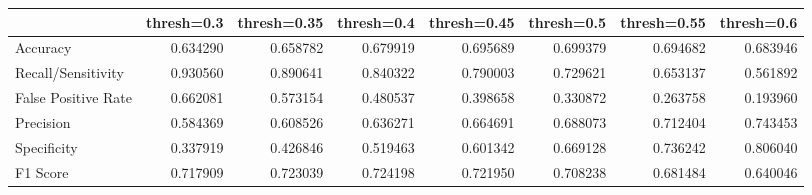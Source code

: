 \begin{tabu}{lrrrrrrr}
\toprule
 & thresh=0.3 & thresh=0.35 & thresh=0.4 & thresh=0.45 & thresh=0.5 & thresh=0.55 & thresh=0.6 \\
\midrule
Accuracy & 0.634290 & 0.658782 & 0.679919 & 0.695689 & 0.699379 & 0.694682 & 0.683946 \\
Recall/Sensitivity & 0.930560 & 0.890641 & 0.840322 & 0.790003 & 0.729621 & 0.653137 & 0.561892 \\
False Positive Rate & 0.662081 & 0.573154 & 0.480537 & 0.398658 & 0.330872 & 0.263758 & 0.193960 \\
Precision & 0.584369 & 0.608526 & 0.636271 & 0.664691 & 0.688073 & 0.712404 & 0.743453 \\
Specificity & 0.337919 & 0.426846 & 0.519463 & 0.601342 & 0.669128 & 0.736242 & 0.806040 \\
F1 Score & 0.717909 & 0.723039 & 0.724198 & 0.721950 & 0.708238 & 0.681484 & 0.640046 \\
\bottomrule
\end{tabu}